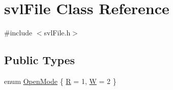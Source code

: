\hypertarget{classsvl_file}{\section{svl\-File Class Reference}
\label{classsvl_file}
}


{\ttfamily \#include $<$svl\-File.\-h$>$}

\subsection*{Public Types}
\begin{DoxyCompactItemize}
\item 
enum \hyperlink{classsvl_file_a457656e908091234c3b92e11596ae1eb}{Open\-Mode} \{ \hyperlink{classsvl_file_a457656e908091234c3b92e11596ae1ebafe4e2c50609d24167be9c0c276c0c6c2}{R} = 1, 
\hyperlink{classsvl_file_a457656e908091234c3b92e11596ae1eba45f29a6a13ea3cf2977585d5f68e5e4b}{W} = 2
 \}
\end{DoxyCompactItemize}
